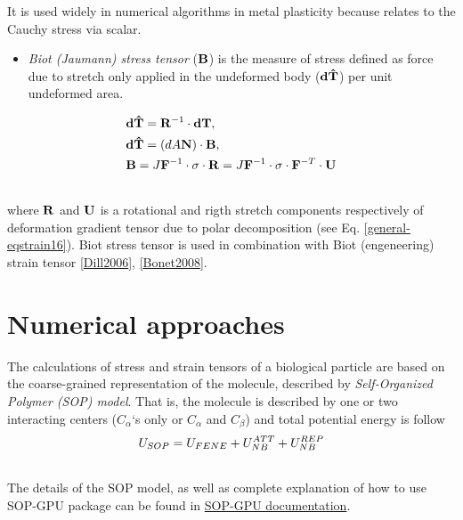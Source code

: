 \documentclass[letterpaper,10pt,english]{sphinxmanual}
\begin{document}
It is used widely in numerical algorithms in metal plasticity because relates to the Cauchy stress via scalar.
\begin{itemize}
\item {} 
\emph{Biot (Jaumann) stress tensor} (${\bf B}$)  is the measure of stress defined as force due to stretch only applied in the undeformed body (${\bf d\hat T}$) per unit undeformed area.

\end{itemize}
\label{general:equation-eqstress8}\begin{gather}
\begin{split}\begin{split}
&{\bf d\hat T} = {\bf R}^{-1} \cdot {\bf dT}, \\
&{\bf d\hat T} = (dA{\bf N}) \cdot {\bf B}, \\
&{\bf B} = J {\bf F}^{-1} \cdot {\bf \sigma} \cdot {\bf R} = J {\bf F}^{-1} \cdot {\bf \sigma} \cdot {\bf F}^{-T} \cdot {\bf U}
\end{split}\end{split}\label{general-eqstress8}\\\begin{split}\end{split}\notag
\end{gather}
where ${\bf R}$ and ${\bf U}$ is a rotational and rigth stretch components respectively of deformation gradient tensor due to polar decomposition (see Eq. \eqref{general-eqstrain16}). Biot stress tensor is used in combination with Biot (engeneering) strain tensor {\hyperref[general:dill2006]{{[}Dill2006{]}}}, {\hyperref[general:bonet2008]{{[}Bonet2008{]}}}.


\chapter{Numerical approaches}
\label{general:numerappr}\label{general:numerical-approaches}
The calculations of stress and strain tensors of a biological particle are based on the coarse-grained representation of the molecule, described by \emph{Self-Organized Polymer (SOP) model}. That is, the molecule is described by one or two interacting centers ($C_\alpha$`s only or $C_\alpha$ and $C_\beta$) and total potential energy is follow
\label{general:equation-usop}\begin{gather}
\begin{split}U_{SOP} = U_{FENE} + U_{NB}^{ATT} + U_{NB}^{REP}\end{split}\label{general-usop}\\\begin{split}\end{split}\notag
\end{gather}
The details of the SOP model, as well as complete explanation of how to use SOP-GPU package can be found in \href{http://sop-gpu.readthedocs.org/}{SOP-GPU documentation}.
\end{document}
